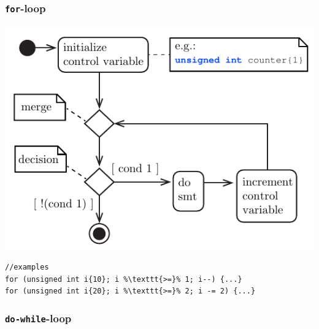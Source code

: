 \subsubsection{\texttt{for}-loop}
\begin{minipage}{.50\textwidth}
\centering
\includegraphics[width=0.80\linewidth]{01_Basics/figures/uml/IterationStatement-01-UML-for.pdf}
\label{fig:ch01_Basics_UML_IterationStatement-01-for}
\end{minipage}
\begin{minipage}{.415\textwidth}
\begin{lstlisting}[frame=tlrb,numbers=none,mathescape=true,escapechar=\%,columns=flexible]
//examples
for (unsigned int i{10}; i %\texttt{>=}% 1; i--) {...}
for (unsigned int i{20}; i %\texttt{>=}% 2; i -= 2) {...}
\end{lstlisting}
\end{minipage}
\vspace{0.5cm}

\subsubsection{\texttt{do-while}-loop}





